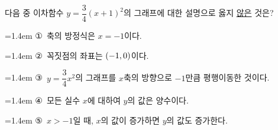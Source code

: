 다음 중 이차함수 $y=\dfrac{3}{4}(x+1)^2$의 그래프에 대한 설명으로 옳지 \underline{않은} 것은?
\par\medskip\par\noindent\hangindent=1.4em {\small ①}\ 축의 방정식은 $x=-1$이다.\par\noindent\hangindent=1.4em {\small ②}\ 꼭짓점의 좌표는 $(-1{,}\mkern3mu 0)$이다.\par\noindent\hangindent=1.4em {\small ③}\ $y=\dfrac{3}{4}x^2$의 그래프를 $x$축의 방향으로 $-1$만큼 평행이동한 것이다.\par\noindent\hangindent=1.4em {\small ④}\ 모든 실수 $x$에 대하여 $y$의 값은 양수이다.\par\noindent\hangindent=1.4em {\small ⑤}\ $x>-1$일 때, $x$의 값이 증가하면 $y$의 값도 증가한다.\par\medskip
